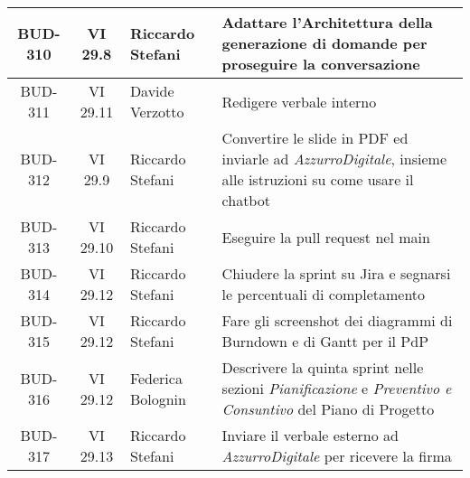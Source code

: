 \begin{table}[htbp]
\begin{tabular}{|c|c|p{}|p{}|}
    \hline
    BUD-310 & VI 29.8 & Riccardo Stefani & Adattare l'Architettura della generazione di domande per proseguire la conversazione\\
    \hline
    BUD-311 & VI 29.11 & Davide Verzotto & Redigere verbale interno \\
    \hline
    BUD-312 & VI 29.9 & Riccardo Stefani & Convertire le slide in PDF ed inviarle ad \emph{AzzurroDigitale}, insieme alle istruzioni su come usare il chatbot \\
    \hline
    BUD-313 & VI 29.10 & Riccardo Stefani & Eseguire la pull request nel main \\
    \hline
    BUD-314 & VI 29.12 & Riccardo Stefani & Chiudere la sprint su Jira e segnarsi le percentuali di completamento \\
    \hline
    BUD-315 & VI 29.12 & Riccardo Stefani & Fare gli screenshot dei diagrammi di Burndown e di Gantt per il PdP \\
    \hline
    BUD-316 & VI 29.12 & Federica Bolognin & Descrivere la quinta sprint nelle sezioni \emph{Pianificazione} e \emph{Preventivo e Consuntivo} del Piano di Progetto\\
    \hline
    BUD-317 & VI 29.13 & Riccardo Stefani & Inviare il verbale esterno ad \emph{AzzurroDigitale} per ricevere la firma\\
    \hline

\end{tabular}
\end{table}